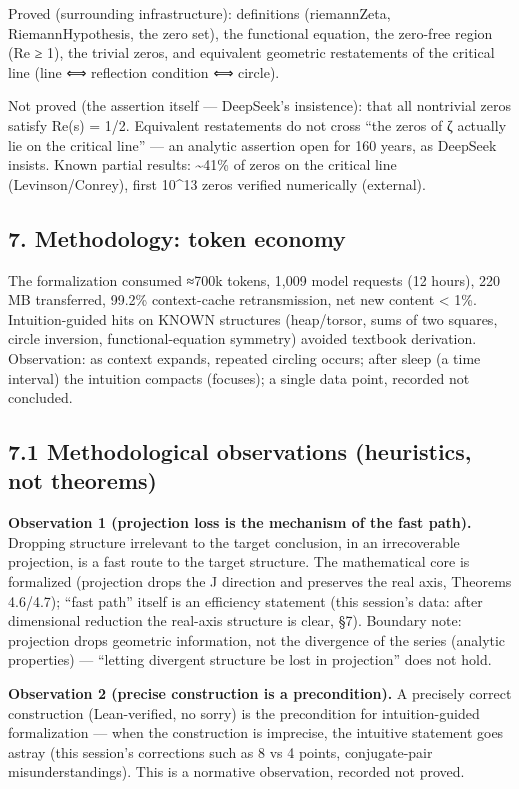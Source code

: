 \documentclass[
]{article}
\begin{document}
Proved (surrounding infrastructure): definitions (riemannZeta,
RiemannHypothesis, the zero set), the functional equation, the zero-free
region (Re ≥ 1), the trivial zeros, and equivalent geometric
restatements of the critical line (line ⟺ reflection condition ⟺
circle).

Not proved (the assertion itself --- DeepSeek's insistence): that all
nontrivial zeros satisfy Re(s) = 1/2. Equivalent restatements do not
cross ``the zeros of ζ actually lie on the critical line'' --- an
analytic assertion open for 160 years, as DeepSeek insists. Known
partial results: \textasciitilde41\% of zeros on the critical line
(Levinson/Conrey), first 10\^{}13 zeros verified numerically (external).

\subsection{7. Methodology: token
economy}\label{methodology-token-economy}

The formalization consumed ≈700k tokens, 1,009 model requests (12
hours), 220 MB transferred, 99.2\% context-cache retransmission, net new
content \textless{} 1\%. Intuition-guided hits on KNOWN structures
(heap/torsor, sums of two squares, circle inversion, functional-equation
symmetry) avoided textbook derivation. Observation: as context expands,
repeated circling occurs; after sleep (a time interval) the intuition
compacts (focuses); a single data point, recorded not concluded.

\subsection{7.1 Methodological observations (heuristics, not
theorems)}\label{methodological-observations-heuristics-not-theorems}

\textbf{Observation 1 (projection loss is the mechanism of the fast
path).} Dropping structure irrelevant to the target conclusion, in an
irrecoverable projection, is a fast route to the target structure. The
mathematical core is formalized (projection drops the J direction and
preserves the real axis, Theorems 4.6/4.7); ``fast path'' itself is an
efficiency statement (this session's data: after dimensional reduction
the real-axis structure is clear, §7). Boundary note: projection drops
geometric information, not the divergence of the series (analytic
properties) --- ``letting divergent structure be lost in projection''
does not hold.

\textbf{Observation 2 (precise construction is a precondition).} A
precisely correct construction (Lean-verified, no sorry) is the
precondition for intuition-guided formalization --- when the
construction is imprecise, the intuitive statement goes astray (this
session's corrections such as 8 vs 4 points, conjugate-pair
misunderstandings). This is a normative observation, recorded not
proved.
\end{document}
